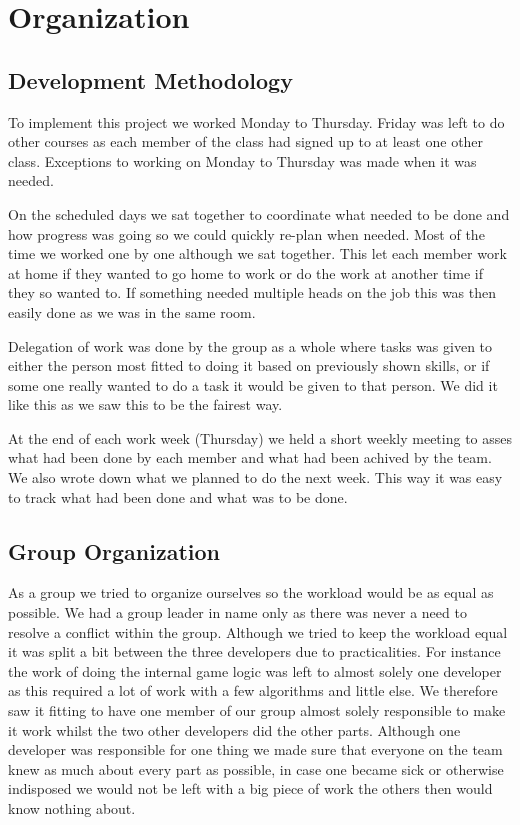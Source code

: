 \section{Organization}
\label{sec:organization}

\subsection{Development Methodology}
\label{subsec:implementation_plan}
To implement this project we worked Monday to Thursday.
Friday was left to do other courses as each member of the class had signed up to at least one other class.
Exceptions to working on Monday to Thursday was made when it was needed.

On the scheduled days we sat together to coordinate what needed to be done and how progress was going so we could quickly re-plan when needed.
Most of the time we worked one by one although we sat together.
This let each member work at home if they wanted to go home to work or do the work at another time if they so wanted to.
If something needed multiple heads on the job this was then easily done as we was in the same room.

Delegation of work was done by the group as a whole where tasks was given to either the person most fitted to doing it based on previously shown skills, or if some one really wanted to do a task it would be given to that person. We did it like this as we saw this to be the fairest way.

At the end of each work week (Thursday) we held a short weekly meeting to asses what had been done by each member and what had been achived by the team.
We also wrote down what we planned to do the next week.
This way it was easy to track what had been done and what was to be done.

\subsection{Group Organization}
\label{subsec:group_organization}
As a group we tried to organize ourselves so the workload would be as equal as possible. 
We had a group leader in name only as there was never a need to resolve a conflict within the group.
Although we tried to keep the workload equal it was split a bit between the three developers due to practicalities. 
For instance the work of doing the internal game logic was left to almost solely one developer as this required a lot of work with a few algorithms and little else.
We therefore saw it fitting to have one member of our group almost solely responsible to make it work whilst the two other developers did the other parts.
Although one developer was responsible for one thing we made sure that everyone on the team knew as much about every part as possible, in case one became sick or otherwise indisposed we would not be left with a big piece of work the others then would know nothing about.


